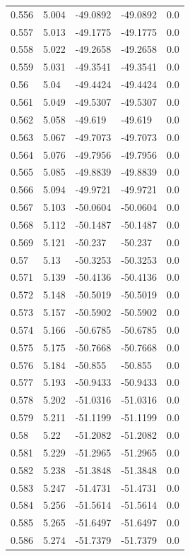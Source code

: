 \begin{table}[H]
\begin{tabular}{lllll}
0.556 & 5.004 & -49.0892 & -49.0892 & 0.0 \\
0.557 & 5.013 & -49.1775 & -49.1775 & 0.0 \\
0.558 & 5.022 & -49.2658 & -49.2658 & 0.0 \\
0.559 & 5.031 & -49.3541 & -49.3541 & 0.0 \\
0.56 & 5.04 & -49.4424 & -49.4424 & 0.0 \\
0.561 & 5.049 & -49.5307 & -49.5307 & 0.0 \\
0.562 & 5.058 & -49.619 & -49.619 & 0.0 \\
0.563 & 5.067 & -49.7073 & -49.7073 & 0.0 \\
0.564 & 5.076 & -49.7956 & -49.7956 & 0.0 \\
0.565 & 5.085 & -49.8839 & -49.8839 & 0.0 \\
0.566 & 5.094 & -49.9721 & -49.9721 & 0.0 \\
0.567 & 5.103 & -50.0604 & -50.0604 & 0.0 \\
0.568 & 5.112 & -50.1487 & -50.1487 & 0.0 \\
0.569 & 5.121 & -50.237 & -50.237 & 0.0 \\
0.57 & 5.13 & -50.3253 & -50.3253 & 0.0 \\
0.571 & 5.139 & -50.4136 & -50.4136 & 0.0 \\
0.572 & 5.148 & -50.5019 & -50.5019 & 0.0 \\
0.573 & 5.157 & -50.5902 & -50.5902 & 0.0 \\
0.574 & 5.166 & -50.6785 & -50.6785 & 0.0 \\
0.575 & 5.175 & -50.7668 & -50.7668 & 0.0 \\
0.576 & 5.184 & -50.855 & -50.855 & 0.0 \\
0.577 & 5.193 & -50.9433 & -50.9433 & 0.0 \\
0.578 & 5.202 & -51.0316 & -51.0316 & 0.0 \\
0.579 & 5.211 & -51.1199 & -51.1199 & 0.0 \\
0.58 & 5.22 & -51.2082 & -51.2082 & 0.0 \\
0.581 & 5.229 & -51.2965 & -51.2965 & 0.0 \\
0.582 & 5.238 & -51.3848 & -51.3848 & 0.0 \\
0.583 & 5.247 & -51.4731 & -51.4731 & 0.0 \\
0.584 & 5.256 & -51.5614 & -51.5614 & 0.0 \\
0.585 & 5.265 & -51.6497 & -51.6497 & 0.0 \\
0.586 & 5.274 & -51.7379 & -51.7379 & 0.0 \\

\end{tabular}
\end{table}
